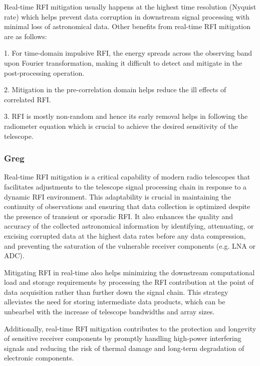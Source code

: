 Real-time RFI mitigation usually happens at the highest time resolution (Nyquist rate) which helps prevent data corruption in downstream signal processing with minimal loss of astronomical data. Other benefits from real-time RFI mitigation are as follows:

1. For time-domain impulsive RFI, the energy 
spreads across the observing band upon Fourier
transformation, making it difficult to detect and
mitigate in the post-processing operation.

2. Mitigation in the pre-correlation domain helps
reduce the ill effects of correlated RFI.

3. RFI is mostly non-random and hence its early removal helps in following the radiometer equation which is crucial to achieve the desired sensitivity of the telescope.








\subsubsection{Greg}
Real-time RFI mitigation is a critical capability of modern radio telescopes that facilitates adjustments to the telescope signal processing chain in response to a dynamic RFI environment. This adaptability is crucial in maintaining the continuity of observations and ensuring that data collection is optimized despite the presence of transient or sporadic RFI. It also enhances the quality and accuracy of the collected astronomical information by identifying, attenuating, or excising corrupted data at the highest data rates before any data compression, and preventing the saturation of the vulnerable receiver components (e.g. LNA or ADC).

Mitigating RFI in real-time also helps minimizing the downstream computational load and storage requirements by processing the RFI contribution at the point of data acquisition rather than further down the signal chain. This strategy alleviates the need for storing intermediate data products, which can be unbearbel with the increase of telescope bandwidths and array sizes.

Additionally, real-time RFI mitigation contributes to the protection and longevity of sensitive receiver components by promptly handling high-power interfering signals and reducing the risk of thermal damage and long-term degradation of electronic components.